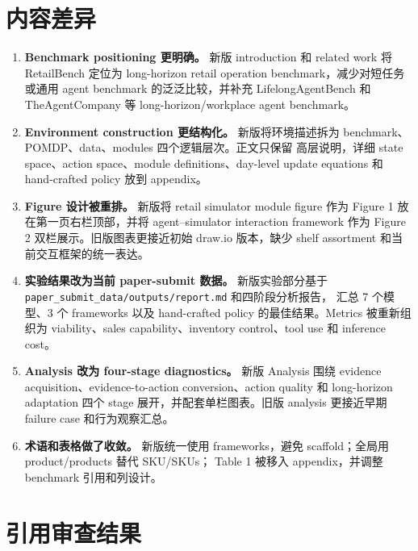\documentclass[11pt,fontset=none]{ctexart}
\begin{document}
\section{内容差异}

\begin{enumerate}
  \item \textbf{Benchmark positioning 更明确。}
  新版 introduction 和 related work 将 RetailBench 定位为 long-horizon retail
  operation benchmark，减少对短任务或通用 agent benchmark 的泛泛比较，并补充
  LifelongAgentBench 和 TheAgentCompany 等 long-horizon/workplace agent benchmark。

  \item \textbf{Environment construction 更结构化。}
  新版将环境描述拆为 benchmark、POMDP、data、modules 四个逻辑层次。正文只保留
  高层说明，详细 state space、action space、module definitions、day-level update
  equations 和 hand-crafted policy 放到 appendix。

  \item \textbf{Figure 设计被重排。}
  新版将 retail simulator module figure 作为 Figure 1 放在第一页右栏顶部，并将
  agent--simulator interaction framework 作为 Figure 2 双栏展示。旧版图表更接近初始
  draw.io 版本，缺少 shelf assortment 和当前交互框架的统一表达。

  \item \textbf{实验结果改为当前 paper-submit 数据。}
  新版实验部分基于 \texttt{paper\_submit\_data/outputs/report.md} 和四阶段分析报告，
  汇总 7 个模型、3 个 frameworks 以及 hand-crafted policy 的最佳结果。Metrics
  被重新组织为 viability、sales capability、inventory control、tool use 和 inference cost。

  \item \textbf{Analysis 改为 four-stage diagnostics。}
  新版 Analysis 围绕 evidence acquisition、evidence-to-action conversion、action quality
  和 long-horizon adaptation 四个 stage 展开，并配套单栏图表。旧版 analysis 更接近早期
  failure case 和行为观察汇总。

  \item \textbf{术语和表格做了收敛。}
  新版统一使用 frameworks，避免 scaffold；全局用 product/products 替代 SKU/SKUs；
  Table 1 被移入 appendix，并调整 benchmark 引用和列设计。
\end{enumerate}

\section{引用审查结果}
\end{document}
